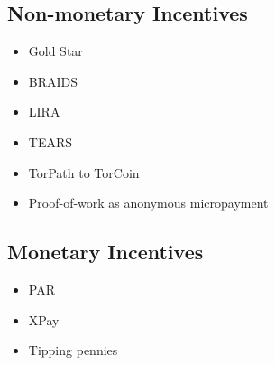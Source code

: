 \subsection{Non-monetary Incentives}

\begin{itemize}
\item Gold Star
\item BRAIDS
\item LIRA
\item TEARS
\item TorPath to TorCoin
\item Proof-of-work as anonymous micropayment
\end{itemize}

\subsection{Monetary Incentives}
\begin{itemize}
\item PAR
\item XPay
\item Tipping pennies
\end{itemize}